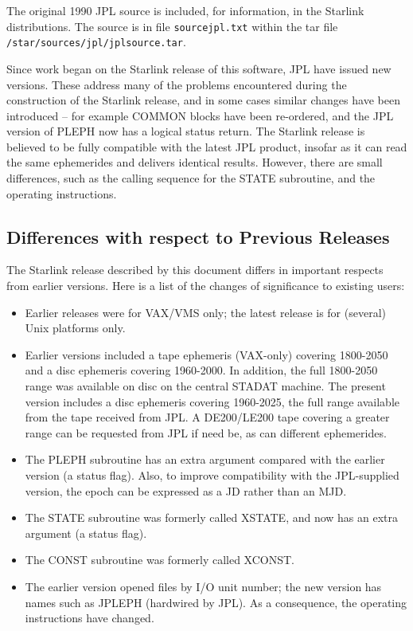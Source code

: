 \documentclass[twoside,11pt]{article}
\newcommand{\xlabel}[1]{}
\renewcommand{\_}{\texttt{\symbol{95}}}
\begin{document}
The original 1990 JPL source is included, for information, in the
Starlink distributions.  The source is in file \texttt{source\_jpl.txt}
within the tar file \texttt{/star/sources/jpl/jpl\_source.tar}.

Since work began on the Starlink release of this software, JPL have issued
new versions.  These address many of the problems encountered during
the construction of the Starlink release, and in some cases similar
changes have been introduced -- for example COMMON blocks have been
re-ordered, and the JPL version of PLEPH now has a logical status return.
The Starlink release is believed to be fully compatible with the latest
JPL product, insofar as it can read the same ephemerides and delivers
identical results.  However, there are small differences, such as the
calling sequence for the STATE subroutine, and the operating instructions.

\subsection{\xlabel{differences_with_respect_to_previous_releases}Differences with respect to Previous Releases}
\label{differences_with_respect_to_previous_releases}

The Starlink release described by this document differs in important
respects from earlier versions.  Here is a list of the changes of
significance to existing users: \begin{itemize}

\item Earlier releases were for VAX/VMS only; the latest release is for
(several) Unix platforms only.

\item Earlier versions included a tape ephemeris (VAX-only) covering
1800-2050 and a disc ephemeris covering 1960-2000.  In addition, the full
1800-2050 range was available on disc on the central STADAT machine. The
present version includes a disc ephemeris covering 1960-2025, the full
range available from the tape received from JPL.  A DE200/LE200 tape
covering a greater range can be requested from JPL if need be, as can
different ephemerides.

\item The PLEPH subroutine has an extra argument compared with the
earlier version (a status flag).  Also, to improve compatibility with
the JPL-supplied version, the epoch can be expressed as a JD rather than
an MJD.

\item The STATE subroutine was formerly called XSTATE, and now has an
extra argument (a status flag).

\item The CONST subroutine was formerly called XCONST.

\item The earlier version opened files by I/O unit number;  the new
version has names such as JPLEPH (hardwired by JPL).  As a consequence,
the operating instructions have changed.

\end{itemize}
\end{document}
